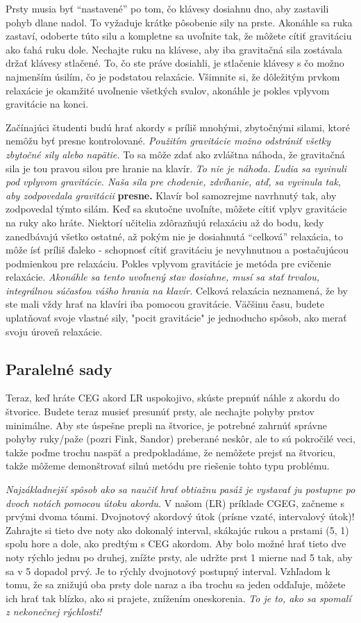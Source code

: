 Prsty musia byť “nastavené” po tom, čo klávesy dosiahnu dno, aby zastavili pohyb dlane nadol. To vyžaduje krátke pôsobenie sily na prste. Akonáhle sa ruka zastaví, odoberte túto silu a kompletne sa uvoľnite tak, že môžete cítiť gravitáciu ako ťahá ruku dole. Nechajte ruku na klávese, aby iba gravitačná sila zostávala držať klávesy stlačené. To, čo ste práve dosiahli, je stlačenie klávesy s čo možno najmenším úsilím, čo je podstatou relaxácie. Všimnite si, že dôležitým prvkom relaxácie je okamžité uvoľnenie všetkých svalov, akonáhle je pokles vplyvom gravitácie na konci.

Začínajúci študenti budú hrať akordy s príliš mnohými, zbytočnými silami, ktoré nemôžu byť presne kontrolované. \emph{Použitím gravitácie možno odstrániť všetky zbytočné sily alebo napätie.} To sa môže zdať ako zvláštna náhoda, že gravitačná sila je tou pravou silou pre hranie na klavír. \textit{To nie je náhoda.} \emph{Ľudia sa vyvinuli pod vplyvom gravitácie. Naša sila pre chodenie, zdvíhanie, atď, sa vyvinula tak, aby zodpovedala gravitácii} \textbf{presne.} Klavír bol samozrejme navrhnutý tak, aby zodpovedal týmto silám. Keď sa skutočne uvoľníte, môžete cítiť vplyv gravitácie na ruky ako hráte. Niektorí učitelia zdôrazňujú relaxáciu až do bodu, kedy zanedbávajú všetko ostatné, až pokým nie je dosiahnutá “celková” relaxácia, to môže ísť príliš ďaleko - schopnosť cítiť gravitáciu je nevyhnutnou a postačujúcou podmienkou pre relaxáciu. Pokles vplyvom gravitácie je metóda pre cvičenie relaxácie. \emph{Akonáhle sa tento uvoľnený stav dosiahne, musí sa stať trvalou, integrálnou súčasťou vášho hrania na klavír.} Celková  relaxácia neznamená, že by ste mali vždy hrať na klavíri iba pomocou gravitácie. Väčšinu času, budete uplatňovať svoje vlastné sily, "pocit gravitácie" je jednoducho spôsob, ako merať svoju úroveň relaxácie.

\subsection{Paralelné sady}
Teraz, keď hráte CEG akord ĽR uspokojivo, skúste prepnúť náhle z akordu do štvorice. Budete teraz musieť presunúť prsty, ale nechajte pohyby prstov minimálne. Aby ste úspešne prepli na štvorice, je potrebné zahrnúť správne pohyby ruky/paže (pozri Fink, Sandor) preberané neskôr, ale to sú pokročilé veci, takže poďme trochu naspäť a predpokladáme, že nemôžete prejsť na štvoricu, takže môžeme demonštrovať silnú metódu pre riešenie tohto typu problému.

\emph{Najzákladnejší spôsob ako sa naučiť hrať obtiažnu pasáž je vystavať ju postupne po dvoch notách pomocou útoku akordu.} V našom (ĽR) príklade CGEG, začneme s prvými dvoma tónmi. Dvojnotový akordový útok (prísne vzaté, intervalový útok)! Zahrajte si tieto dve noty ako dokonalý interval, skákajúc rukou a prstami (5, 1) spolu hore a dole, ako predtým s CEG akordom. Aby bolo možné hrať tieto dve noty rýchlo jednu po druhej, znížte prsty, ale udržte prst 1 mierne nad 5 tak, aby sa v 5 dopadol prvý. Je to rýchly dvojnotový postupný interval. Vzhľadom k tomu, že sa znižujú oba prsty dole naraz a iba trochu sa jeden odďaľuje, môžete ich hrať tak blízko, ako si prajete, znížením oneskorenia. \emph{To je to, ako sa spomalí z nekonečnej rýchlosti!}

